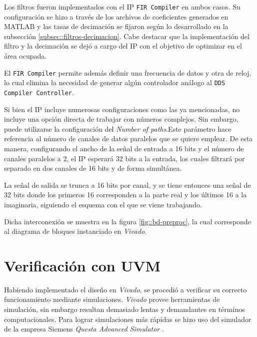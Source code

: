 \documentclass[../../main.tex]{subfiles}
\begin{document}
Los filtros fueron implementados con el IP \texttt{FIR Compiler} en ambos casos. Su configuración se hizo a través de los archivos de coeficientes generados en MATLAB y las tasas de decimación se fijaron según lo desarrollado en la subsección \ref{subsec::filtros-decimacion}.
 Cabe destacar que la implementación del filtro y la decimación se dejó a cargo del IP con el objetivo de optimizar en el área ocupada.

El \texttt{FIR Compiler} permite además definir una frecuencia de datos y otra de reloj, lo cual elimina la necesidad de generar algún controlador análogo al \texttt{DDS Compiler Controller}.

Si bien el IP incluye numerosas configuraciones como las ya mencionadas, no incluye una opción directa de trabajar con números complejos. Sin embargo, puede utilizarse la configuración del \textit{Number of paths}.Este parámetro hace referencia al número de canales de datos paralelos que se quiere emplear. De esta manera, configurando el ancho de la señal de entrada a 16 bits y el número de canales paralelos a 2, el IP esperará 32 bits a la entrada, los cuales filtrará por separado en dos canales de 16 bits y de forma simultánea.

La señal de salida se trunca a 16 bits por canal, y se tiene entonces una señal de 32 bits donde los primeros 16 corresponden a la parte real y los últimos 16 a la imaginaria, siguiendo el esquema con el que se viene trabajando.

Dicha interconexión se muestra en la figura \ref{fig::bd-preproc}, la cual corresponde al diagrama de bloques instanciado en \textit{Vivado}. 


\section{Verificación con UVM}\label{sec::simu-uvm}
Habiendo implementado el diseño en \textit{Vivado}, se procedió a verificar su correcto funcionamiento mediante simulaciones. \textit{Vivado} provee herramientas de simulación, sin embargo resultan demasiado lentas y demandantes en términos computacionales. Para lograr simulaciones más rápidas se hizo uso del simulador de la empresa Siemens \textit{Questa Advanced Simulator} \cite{questa}. 
\end{document}
